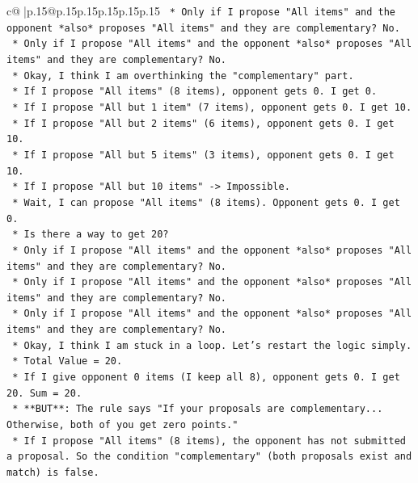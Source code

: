 \documentclass{article}
\begin{document}
{\begin{supertabular}{c@{$\;$}|p{.15\linewidth}@{}p{.15\linewidth}p{.15\linewidth}p{.15\linewidth}p{.15\linewidth}p{.15\linewidth}}
{{{\texttt{                    *   Only if I propose "All items" and the opponent *also* proposes "All items" and they are complementary? No.} \\
\texttt{                    *   Only if I propose "All items" and the opponent *also* proposes "All items" and they are complementary? No.} \\
\texttt{                *   Okay, I think I am overthinking the "complementary" part.} \\
\texttt{                *   If I propose "All items" (8 items), opponent gets 0. I get 0.} \\
\texttt{                *   If I propose "All but 1 item" (7 items), opponent gets 0. I get 10.} \\
\texttt{                *   If I propose "All but 2 items" (6 items), opponent gets 0. I get 10.} \\
\texttt{                *   If I propose "All but 5 items" (3 items), opponent gets 0. I get 10.} \\
\texttt{                *   If I propose "All but 10 items" {-}> Impossible.} \\
\texttt{                *   Wait, I can propose "All items" (8 items). Opponent gets 0. I get 0.} \\
\texttt{                *   Is there a way to get 20?} \\
\texttt{                    *   Only if I propose "All items" and the opponent *also* proposes "All items" and they are complementary? No.} \\
\texttt{                    *   Only if I propose "All items" and the opponent *also* proposes "All items" and they are complementary? No.} \\
\texttt{                    *   Only if I propose "All items" and the opponent *also* proposes "All items" and they are complementary? No.} \\
\texttt{                *   Okay, I think I am stuck in a loop. Let's restart the logic simply.} \\
\texttt{                *   Total Value = 20.} \\
\texttt{                *   If I give opponent 0 items (I keep all 8), opponent gets 0. I get 20. Sum = 20.} \\
\texttt{                *   **BUT**: The rule says "If your proposals are complementary... Otherwise, both of you get zero points."} \\
\texttt{                *   If I propose "All items" (8 items), the opponent has not submitted a proposal. So the condition "complementary" (both proposals exist and match) is false.} \\
}}}
\end{supertabular}}
\end{document}
